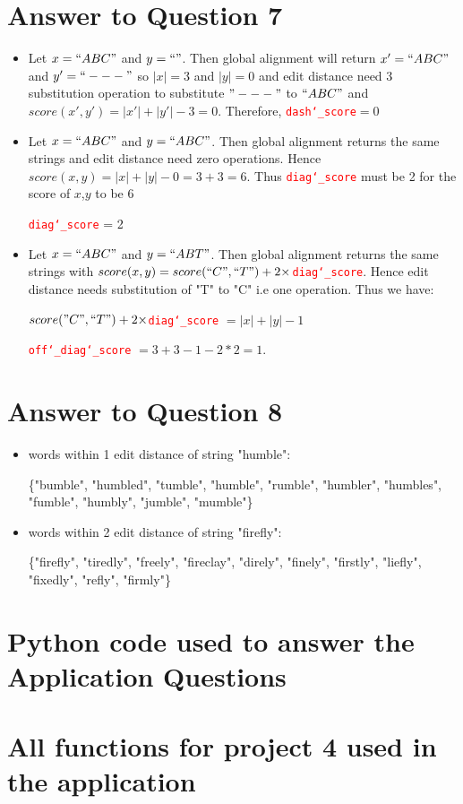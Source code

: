 \documentclass[a4paper]{article}
\begin{document}
\section*{Answer to Question 7}
\begin{itemize}
    \item Let $x = ``ABC"$ and $y = ``"$. Then global alignment will return $x' = ``ABC"$ and $y' = ``---"$ so $|x| = 3$ and $|y| = 0$ and edit distance need 3 substitution operation to substitute $"---"$ to $``ABC"$ and $score(x', y') = |x'| +|y'| - 3 = 0$. Therefore, \textcolor{red}{\texttt{dash\char`_score}}$ = 0$
    
    \item Let $x = ``ABC"$ and $y = ``ABC"$. Then global alignment returns the same strings and edit distance need zero operations. Hence $score(x, y) = |x| + |y| - 0 = 3 + 3 = 6$. Thus \textcolor{red}{\texttt{diag\char`_score}} must be 2 for the score of $x$,$y$ to be 6
    
    \textcolor{red}{\texttt{diag\char`_score}} = 2
    
    \item Let $x = ``ABC"$ and $y = ``ABT"$. Then global alignment returns the same strings with $score(x, y) = score(``C", ``T") + 2\times $\textcolor{red}{\texttt{diag\char`_score}}. Hence edit distance needs substitution of "T" to "C" i.e one operation. Thus we have:
    
    $score("C", ``T") + 2 \times $\textcolor{red}{\texttt{diag\char`_score}} $= |x| + |y| - 1$
    
  \textcolor{red}{\texttt{off\char`_diag\char`_score}} $= 3 + 3 - 1 - 2 * 2 = 1$.
  
\end{itemize}

\section*{Answer to Question 8}
\begin{itemize}
    \item words within 1 edit distance of string "humble":
    
\{"bumble", "humbled", "tumble", "humble", "rumble", "humbler", "humbles", "fumble", "humbly", "jumble", "mumble"\}

\item words within 2 edit distance of string "firefly":

\{"firefly", "tiredly", "freely", "fireclay", "direly", "finely", "firstly", "liefly", "fixedly", "refly", "firmly"\}
\end{itemize}

\newpage
\appendix
\section{Python code used to answer the Application Questions}

\section{All functions for project 4 used in the application}

\end{document}
